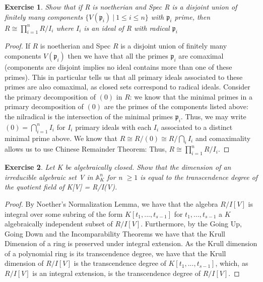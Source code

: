 \documentclass{article}
\newcommand{\bb}[1]{\mathbb{#1}}
\newcommand{\fk}[1]{\mathfrak{#1}}
\newtheorem{exercise}{Exercise}
\begin{document}
\begin{exercise}
  Show that if R is noetherian and Spec R is a disjoint union of finitely many components $\{ V(\fk{p}_{i}) \ | \ 1 \leq i \leq n \}$ with $\fk{p}_{i}$ prime, then $R \cong \prod_{i=1}^{n} R/I_{i}$ where $I_{i}$ is an ideal of R with radical $\fk{p}_{i}$
\end{exercise}
\begin{proof}
  If $R$ is noetherian and Spec $R$ is a disjoint union of finitely many components $V(\fk{p}_{i})$ then we have that all the primes $\fk{p}_{i}$ are comaximal (components are disjoint implies no ideal contains more than one of these primes). This in particular tells us that all primary ideals associated to these primes are also comaximal, as closed sets correspond to radical ideals. Consider the primary decomposition of $(0)$ in $R$: we know that the minimal primes in a primary decomposition of $(0)$ are the primes of the components listed above: the nilradical is the intersection of the minimal primes $\fk{p}_{i}$. Thus, we may write $(0) = \bigcap_{i=1}^{n} I_{i}$ for $I_{i}$ primary ideals with each $I_{i}$ associated to a distinct minimal prime above. We know that $R \cong R/ (0) \cong R/ \bigcap_{i} I_{i}$ and comaximality allows us to use Chinese Remainder Theorem: Thus, $R \cong \prod_{i=1}^{n}R/I_{i}$.  
\end{proof}
\newpage 
\begin{exercise}
  Let K be algebraically closed. Show that the dimension of an irreducible algebraic set V in $\bb{A}^{n}_{K}$ for n $\geq 1$ is equal to the transcendence degree of the quotient field of K[V] = R/I(V). 
\end{exercise}
\begin{proof}
  By Noether's Normalization Lemma, we have that the algebra $R/I[V]$ is integral over some subring of the form $K[t_{1},...,t_{s-1}]$ for $t_{1},...,t_{s-1}$ a $K$ algebraically independent subset of $R/I[V]$. Furthermore, by the Going Up, Going Down and the Incomparability Theorems we have that the Krull Dimension of a ring is preserved under integral extension. As the Krull dimension of a polynomial ring is its transcendence degree, we have that the Krull dimension of $R/I[V]$ is the transcendence degree of $K[t_{1},...,t_{s-1}]$, which, as $R/I[V]$ is an integral extension, is the transcendence degree of $R/I[V]$.   
\end{proof}
\end{document}
